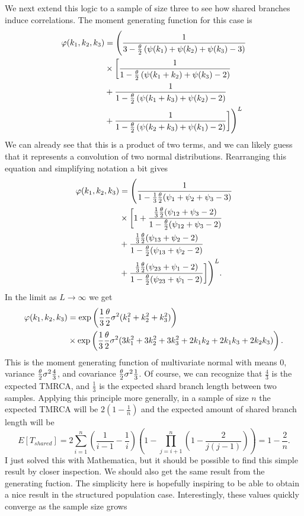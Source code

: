 We next extend this logic to a sample of size three to see how shared branches induce correlations. The moment
generating function for this case is
\begin{align}
  \label{eq:three}
  \varphi(k_1,k_2,k_3) &= \Biggl( \frac{1}{3-\frac{\theta}{2}\left( \psi(k_1) + \psi(k_2) + \psi(k_3) -3 \right)} \nonumber \\
                       &\times \biggl[ \frac{1}{ 1-\frac{\theta}{2} \left( \psi(k_1+k_2) + \psi(k_3) - 2 \right) } \nonumber\\
                       &+ \frac{1}{1-\frac{\theta}{2}\left( \psi(k_1+k_3) + \psi(k_2) - 2  \right)} \nonumber \\ 
                       &+ \frac{1}{1-\frac{\theta}{2}\left( \psi(k_2+k_3) + \psi(k_1) -2 \right)} \biggr] \Biggr)^L
\end{align}
We can already see that this is a product of two terms, and we can likely guess that it represents a convolution of two
normal distributions. Rearranging this equation and simplifying notation a bit gives
\begin{align}
  \varphi(k_1,k_2,k_3) &= \Biggl( \frac{1}{1-\frac{1}{3}\frac{\theta}{2} (\psi_1 + \psi_2 + \psi_3 -3)} \nonumber \\
                       &\times \biggl[ 1 + \frac{\frac{1}{3}\frac{\theta}{2}(\psi_{12} + \psi_3-2)}{1-\frac{\theta}{2}(\psi_{12} + \psi_3-2)} \nonumber \\
                       &+ \frac{\frac{1}{3}\frac{\theta}{2}(\psi_{13} + \psi_2-2)}{1-\frac{\theta}{2}(\psi_{13} + \psi_2-2)} \nonumber \\
                       &+ \frac{\frac{1}{3}\frac{\theta}{2}(\psi_{23} + \psi_1-2)}{1-\frac{\theta}{2}(\psi_{23} + \psi_1-2)}\biggr] \Biggr)^L.
\end{align}
In the limit as $L\to\infty$ we get
\begin{align}
  \varphi(k_1,k_2,k_3) &= \exp\left( \frac{1}{3}\frac{\theta}{2}\sigma^2(k_1^2 + k_2^2 + k_3^2)\right) \nonumber \\
                       &\times \exp\left( \frac{1}{3}\frac{\theta}{2}\sigma^2 (3k_1^2 + 3k_2^2 + 3k_3^2 + 2k_1k_2 + 2k_1k_3 + 2k_2k_3) \right).
\end{align}
This is the moment generating function of multivariate normal with means $0$, variance $\frac{\theta}{2}\sigma^2\frac{4}{3}$, and
covariance $\frac{\theta}{2}\sigma^2\frac{1}{3}$. Of course, we can recognize that $\frac{4}{3}$ is the expected TMRCA, and
$\frac{1}{3}$ is the expected shard branch length between two samples. Applying this principle more generally, in a
sample of size $n$ the expected TMRCA will be $2(1-\frac{1}{n})$ and the expected amount of shared branch length will be
\begin{equation}
  \label{eq:shared}
  E[T_{shared}]=2\sum_{i=1}^n\left( \frac{1}{i-1} - \frac{1}{i}\right)\left(1- \prod_{j=i+1}^n\left(1-\frac{2}{j(j-1)} \right)\right)=1-\frac{2}{n}.
\end{equation}
I just solved this with Mathematica, but it should be possible to find this simple result by closer inspection. We
should also get the same result from the generating fuction. The simplicity here is hopefully inspiring to be able to
obtain a nice result in the structured population case. Interestingly, these values quickly converge as the sample size grows
